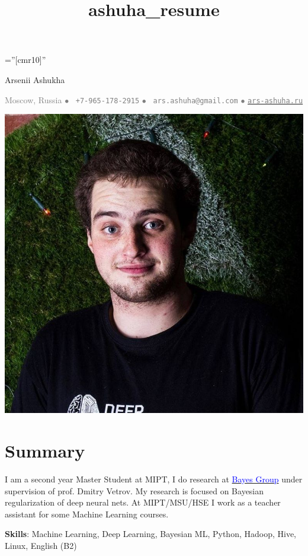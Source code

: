 \documentclass[a4paper,10pt]{article} %
\title{ashuha_resume}
\begin{document}
\pagestyle{empty} %

\font\fb=''[cmr10]'' %
\oddsidemargin=0pt 		%

\begin{center}
	{\huge Arsenii Ashukha}
\end{center}
\begin{center}
\textcolor{gray}{
Moscow, Russia $\bullet$ 
\Mobilefone~\texttt{+7-965-178-2915} $\bullet$ 
\Letter~\textcolor{gray}{\texttt{ars.ashuha@gmail.com}} $\bullet$ \href{https://ars-ashuha.ru/}{\textcolor{gray}{\texttt{ars-ashuha.ru}}}}
\end{center}
\setlength{\columnsep}{-330pt}
\begin{multicols}{2}
\includegraphics[scale=0.13]{img/avatar_rect2}

\section{Summary}
 \vspace{-0.2cm}
 
I am a second year Master Student at MIPT, I do research at \href{bayesgroup.ru}{\textcolor{blue}{Bayes Group}} under supervision of prof. Dmitry Vetrov. My research is focused on Bayesian regularization of deep neural nets. At MIPT/MSU/HSE I work as a teacher assistant for some Machine Learning courses. 
 

\textbf{Skills}: Machine Learning, Deep Learning, Bayesian ML, Python, Hadoop, Hive, Linux, English (B2)

\end{multicols}
\end{document}

